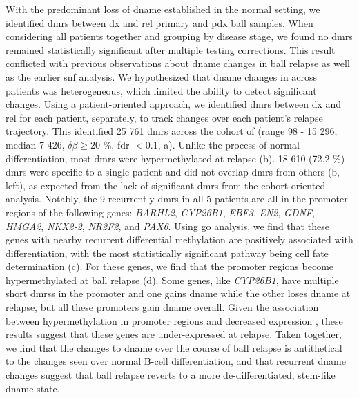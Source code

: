 With the predominant loss of \gls{dname} established in the normal setting, we identified \glspl{dmr} between \gls{dx} and \gls{rel} primary and \gls{pdx} \gls{ball} samples.
When considering all patients together and grouping by disease stage, we found no \glspl{dmr} remained statistically significant after multiple testing corrections.
This result conflicted with previous observations about \gls{dname} changes in \gls{ball} relapse \cite{leeEpigeneticRemodelingBcell2015,nordlundGenomewideSignaturesDifferential2013} as well as the earlier \gls{snf} analysis.
We hypothesized that \gls{dname} changes in across patients was heterogeneous, which limited the ability to detect significant changes.
Using a patient-oriented approach, we identified \glspl{dmr} between \gls{dx} and \gls{rel} for each patient, separately, to track changes over each patient's relapse trajectory.
This identified 25 761 \glspl{dmr} across the cohort of (range 98 - 15 296, median 7 426, $\delta \beta \ge 20$ \%, \gls{fdr} $< 0.1$, a).
Unlike the process of normal differentiation, most \glspl{dmr} were hypermethylated at relapse (b).
18 610 (72.2 \%) \glspl{dmr} were specific to a single patient and did not overlap \glspl{dmr} from others (b, left), as expected from the lack of significant \glspl{dmr} from the cohort-oriented analysis.
Notably, the 9 recurrently \glspl{dmr} in all 5 patients are all in the promoter regions of the following genes: \emph{BARHL2}, \emph{CYP26B1}, \emph{EBF3}, \emph{EN2}, \emph{GDNF}, \emph{HMGA2}, \emph{NKX2-2}, \emph{NR2F2}, and \emph{PAX6}.
Using \gls{go} analysis, we find that these genes with nearby recurrent differential methylation are positively associated with differentiation, with the most statistically significant pathway being cell fate determination (c).
For these genes, we find that the promoter regions become hypermethylated at \gls{ball} relapse (d).
Some genes, like \emph{CYP26B1}, have multiple short \glspl{dmrs} in the promoter and one gains \gls{dname} while the other loses \gls{dname} at relapse, but all these promoters gain \gls{dname} overall.
Given the association between hypermethylation in promoter regions and decreased expression \cite{jonesFunctionsDNAMethylation2012}, these results suggest that these genes are under-expressed at relapse.
Taken together, we find that the changes to \gls{dname} over the course of \gls{ball} relapse is antithetical to the changes seen over normal B-cell differentiation, and that recurrent \gls{dname} changes suggest that \gls{ball} relapse reverts to a more de-differentiated, stem-like \gls{dname} state.

